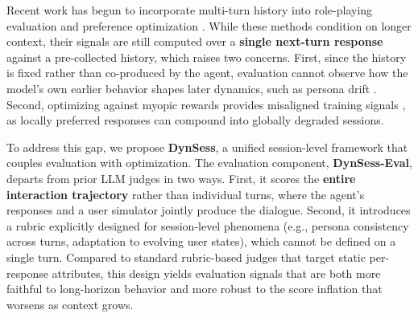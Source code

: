 Recent work has begun to incorporate multi-turn history into role-playing evaluation \cite{zhou2025characterbench, xiang-etal-2025-rmtbench} and preference optimization \cite{ye-etal-2025-cpo}. While these methods condition on longer context, their signals are still computed over a \textbf{single next-turn response} against a pre-collected history, which raises two concerns. First, since the history is fixed rather than co-produced by the agent, evaluation cannot observe how the model's own earlier behavior shapes later dynamics, such as persona drift . Second, optimizing against  myopic rewards provides misaligned training signals \cite{shani2024multi, collabllm2025}, as locally preferred responses can compound into globally degraded sessions. 



To address this gap, we propose \textbf{DynSess}, a unified session-level framework that couples evaluation with optimization. The evaluation component, \textbf{DynSess-Eval}, departs from prior LLM judges in two ways. First, it scores the \textbf{entire interaction trajectory} rather than individual turns, where the agent's responses and a user simulator jointly produce the dialogue. Second, it introduces a rubric explicitly designed for session-level phenomena (e.g., persona consistency across turns, adaptation to evolving user states), which cannot be defined on a single turn. Compared to standard rubric-based judges \cite{lee2025checkeval, chiang2025tract} that target static per-response attributes, this design yields evaluation signals that are both more faithful to long-horizon behavior and more robust to the score inflation that worsens as context grows.




